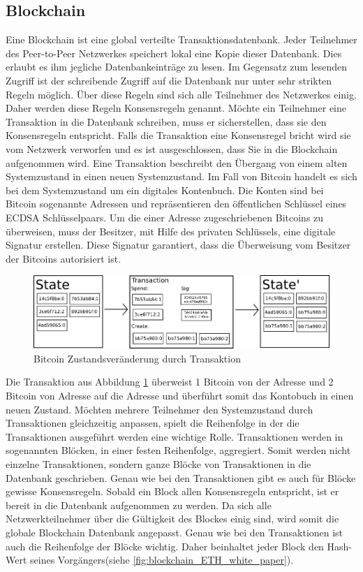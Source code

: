 \subsection{Blockchain}
Eine Blockchain ist eine global verteilte Transaktionsdatenbank. Jeder Teilnehmer des Peer-to-Peer Netzwerkes speichert lokal eine Kopie dieser Datenbank. Dies erlaubt es ihm jegliche Datenbankeinträge zu lesen. Im Gegensatz zum lesenden Zugriff ist der schreibende Zugriff auf die Datenbank nur unter sehr strikten Regeln möglich. Über diese Regeln sind sich alle Teilnehmer des Netzwerkes einig. Daher werden diese Regeln Konsensregeln genannt. Möchte ein Teilnehmer eine Transaktion in die Datenbank schreiben, muss er sicherstellen, dass sie den Konsensregeln entspricht. Falls die Transaktion eine Konsensregel bricht wird sie vom Netzwerk verworfen und es ist ausgeschlossen, dass Sie in die Blockchain aufgenommen wird. Eine Transaktion beschreibt den Übergang von einem alten Systemzustand in einen neuen Systemzustand.
Im Fall von Bitcoin handelt es sich bei dem Systemzustand um ein digitales Kontenbuch. Die Konten sind bei Bitcoin sogenannte Adressen und repräsentieren den öffentlichen Schlüssel eines ECDSA Schlüsselpaars. Um die einer Adresse zugeschriebenen Bitcoins zu überweisen, muss der Besitzer, mit Hilfe des privaten Schlüssels, eine digitale Signatur erstellen. Diese Signatur garantiert, dass die Überweisung vom Besitzer der Bitcoins autorisiert ist.

\begin{figure}[H]
\centering
\includegraphics[width=1\linewidth]{Figures/BTC_statetransition_ETH_white_paper}
\decoRule
\caption{Bitcoin Zustandsveränderung durch Transaktion}
\label{fig:BTC_statetransition_ETH_white_paper}
\end{figure}

Die Transaktion aus Abbildung \ref{fig:BTC_statetransition_ETH_white_paper} überweist 1 Bitcoin von der Adresse  und 2 Bitcoin von Adresse  auf die Adresse  und überführt somit das Kontobuch in einen neuen Zustand. Möchten mehrere Teilnehmer den Systemzustand durch Transaktionen gleichzeitig anpassen, spielt die Reihenfolge in der die Transaktionen ausgeführt werden eine wichtige Rolle. Transaktionen werden in sogenannten Blöcken, in einer festen Reihenfolge, aggregiert. Somit werden nicht einzelne Transaktionen, sondern ganze Blöcke von Transaktionen in die Datenbank geschrieben. Genau wie bei den Transaktionen gibt es auch für Blöcke gewisse Konsensregeln. Sobald ein Block allen Konsensregeln entspricht, ist er bereit in die Datenbank aufgenommen zu werden.
Da sich alle Netzwerkteilnehmer über die Gültigkeit des Blockes einig sind, wird somit die globale Blockchain Datenbank angepasst. Genau wie bei den Transaktionen ist auch die Reihenfolge der Blöcke wichtig. Daher beinhaltet jeder Block den Hash-Wert seines Vorgängers(siehe \ref{fig:blockchain_ETH_white_paper}).

